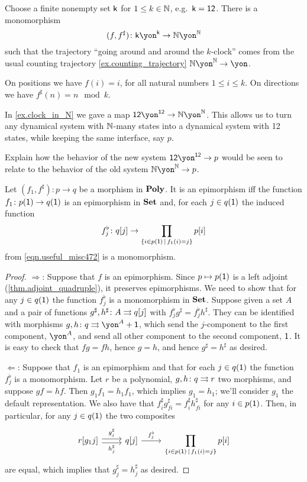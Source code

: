 \documentclass[Book-Poly]{subfiles}
\begin{document}
\begin{example}\label{ex.clock_in_N}
Choose a finite nonempty set $\mathsf{k}$ for $1\leq k\in\mathbb{N}$, e.g.\ $\mathsf{k}=\textsf{1}\textsf{2}$. There is a monomorphism
\[
(f,f^\sharp)\colon\ord{k}\yon^{\ord{k}}\to\nn\yon^\nn
\]
such that the trajectory ``going around and around the $k$-clock'' comes from the usual counting trajectory \cref{ex.counting_trajectory} $\nn\yon^\nn\to\yon$.

On positions we have $f(i)=i$, for all natural numbers $1\leq i\leq k$. On directions we have $f^\sharp(n)=n\mod k$.
\end{example}

\begin{exercise}
In \cref{ex.clock_in_N} we gave a map $\1\2\yon^{\1\2}\to\nn\yon^\nn$. This allows us to turn any dynamical system with $\mathbb{N}$-many states into a dynamical system with 12 states, while keeping the same interface, say $p$. 

Explain how the behavior of the new system $\1\2\yon^{\1\2}\to p$ would be seen to relate to the behavior of the old system $\nn\yon^\nn\to p$.
\end{exercise}

\begin{proposition}\label{prop.epis_in_poly}
Let $(f_1,f^\sharp)\colon p\to q$ be a morphism in $\textbf{Poly}$. It is an epimorphism iff the function $f_1\colon p(\textsf{1})\to q(\textsf{1})$ is an epimorphism in $\textbf{Set}$ and, for each $j\in q(\textsf{1})$ the induced function 
\[
f^\flat_j\colon q[j]\to\prod_{\{i\in p(\textsf{1})\,\mid\, f_1(i)=j\}}p[i]
\]
from \eqref{eqn.useful_misc472} is a monomorphism.
\end{proposition}
\begin{proof}
\noindent$\Rightarrow$: Suppose that $f$ is an epimorphism. Since $p\mapsto p(\textsf{1})$ is a left adjoint (\cref{thm.adjoint_quadruple}), it preserves epimorphisms. We need to show that for any $j\in q(\textsf{1})$ the  function $f^\flat_j$ is a monomorphism in $\textbf{Set}$. Suppose given a set $A$ and a pair of functions $g^\sharp,h^\sharp\colon A\rightrightarrows q[j]$ with $f^\flat_jg^\sharp=f^\flat_jh^\sharp$. They can be identified with morphisms $g,h\colon q\tto \yon^A+\1$, which send the $j$-component to the first component, $\yon^A$, and send all other component to the second component, $\textsf{1}$. It is easy to check that $fg=fh$, hence $g=h$, and hence $g^\sharp=h^\sharp$ as desired.

\noindent$\Leftarrow$: Suppose that $f_1$ is an epimorphism and that for each $j\in q(\textsf{1})$ the function $f^\flat_j$ is a monomorphism. Let $r$ be a polynomial, $g,h\colon q\rightrightarrows r$ two morphisms, and suppose $gf=hf$. Then $g_1f_1=h_1f_1$, which implies $g_1=h_1$; we'll consider $g_1$ the default representation. We also have that $f^\sharp_ig^\sharp_{fi}=f^\sharp_ih^\sharp_{fi}$ for any $i\in p(\textsf{1})$. Then, in particular, for any $j\in q(\textsf{1})$ the two composites
\[
\begin{tikzcd}
	r[g_1j]\ar[r, shift left, "g^\sharp_j"]\ar[r, shift right, "h^\sharp_j"']&q[j]\ar[r, "f^\flat_j"]&\displaystyle\prod_{\{i\in p(\1)\,\mid\,f_1(i)=j\}}p[i]
\end{tikzcd}
\]
are equal, which implies that $g^\sharp_j=h^\sharp_j$ as desired.
\end{proof}
\end{document}
